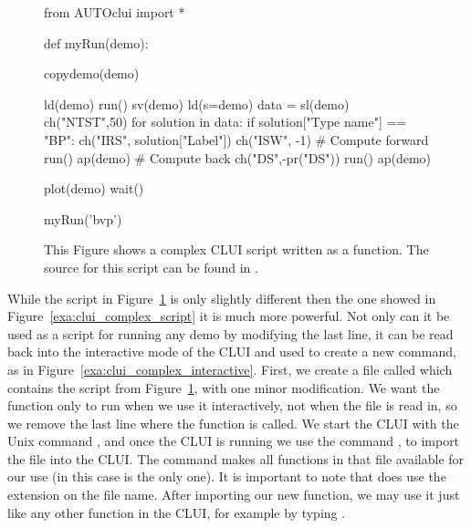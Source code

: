 \documentclass[12pt]{report}
\begin{document}
 \begin{figure}[htbp]
 {\small \begin{center} \begin{boxedverbatim}
 from AUTOclui import *

 def myRun(demo):

     copydemo(demo)

     ld(demo)
     run()
     sv(demo)
     ld(s=demo)
     data = sl(demo)
     ch("NTST",50)
     for solution in data:
         if solution["Type name"] == "BP":
             ch("IRS", solution["Label"])
             ch("ISW", -1)
             # Compute forward
             run()
             ap(demo)
             # Compute back
             ch("DS",-pr("DS"))
             run()
             ap(demo)

     plot(demo)
     wait()

 myRun('bvp')

 \end{boxedverbatim}
 \end{center} 
 }
 \caption[A complex \AUTO CLUI script as a function.]
 {This Figure shows a complex \AUTO CLUI script
 written as a function.
 The source for this script can be found in .
 }
 \label{exa:clui_complex_function}
 \end{figure}

 While the script in Figure~\ref{exa:clui_complex_function} is 
 only slightly different then the one showed in 
 Figure~\ref{exa:clui_complex_script} it is much more powerful.
 Not only can it be used as a script for running any demo
 by modifying the last line, it can be read back into
 the interactive mode of the \AUTO CLUI and
 used to create a new command, 
 as in Figure~\ref{exa:clui_complex_interactive}.
 First, we create a file called 
 which contains the script from 
 Figure~\ref{exa:clui_complex_function}, with
 one minor modification.  We want the function only
 to run when we use it interactively, not when
 the file  is read in, so we
 remove the last line where the function is called.
 We start the \AUTO CLUI with the Unix command
 , and once the \AUTO CLUI is running
 we use the command ,
 to import the file  into the
 \AUTO CLUI.  The  command makes
 all functions in that file available for
 our use (in this case  is the only 
 one).  It is important to note that 
  does 
 use the  extension on the file name. 
 After importing our new function, we may use it
 just like any other function in the \AUTO
 CLUI, for example by typing .
\end{document}
